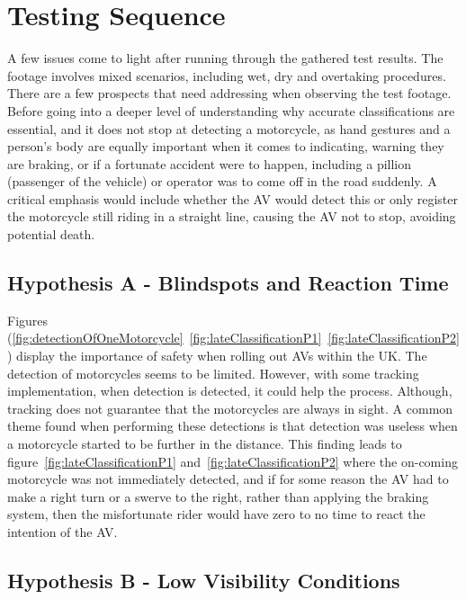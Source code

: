 \documentclass[12pt]{report} %
\begin{document}

	\section{Testing Sequence}
		A few issues come to light after running through the gathered test results. The footage involves mixed scenarios, including wet, dry and overtaking procedures. There are a few prospects that need addressing when observing the test footage. Before going into a deeper level of understanding why accurate classifications are essential, and it does not stop at detecting a motorcycle, as hand gestures and a person's body are equally important when it comes to indicating, warning they are braking, or if a fortunate accident were to happen, including a pillion (passenger of the vehicle) or operator was to come off in the road suddenly. A critical emphasis would include whether the AV would detect this or only register the motorcycle still riding in a straight line, causing the AV not to stop, avoiding potential death.

	\subsection*{Hypothesis A - Blindspots and Reaction Time}
		Figures (\ref{fig:detectionOfOneMotorcycle}~\ref{fig:lateClassificationP1}~\ref{fig:lateClassificationP2}) display the importance of safety when rolling out AVs within the UK. The detection of motorcycles seems to be limited. However, with some tracking implementation, when detection is detected, it could help the process. Although, tracking does not guarantee that the motorcycles are always in sight. A common theme found when performing these detections is that detection was useless when a motorcycle started to be further in the distance. This finding leads to figure~\ref{fig:lateClassificationP1} and~\ref{fig:lateClassificationP2} where the on-coming motorcycle was not immediately detected, and if for some reason the AV had to make a right turn or a swerve to the right, rather than applying the braking system, then the misfortunate rider would have zero to no time to react the intention of the AV.

	\subsection*{Hypothesis B - Low Visibility Conditions}
\end{document}
